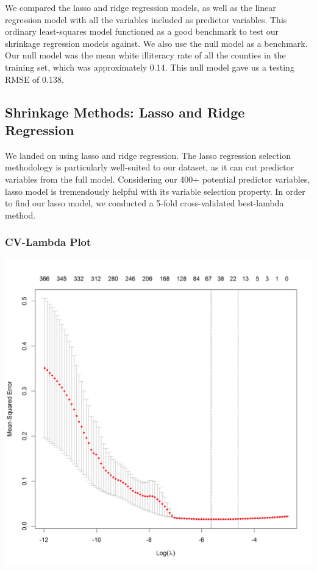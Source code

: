 \documentclass[a4paper,12pt]{article}
\begin{document}
We compared the lasso and ridge regression models, as well as the linear regression model with all the variables included as predictor variables. This ordinary least-squares model functioned as a good benchmark to test our shrinkage regression models against. We also use the null model as a benchmark. Our null model was the mean white illiteracy rate of all the counties in the training set, which was approximately 0.14. This null model gave us a testing RMSE of 0.138. 

\subsection{Shrinkage Methods: Lasso and Ridge Regression}
We landed on using lasso and ridge regression. The lasso regression selection methodology is particularly well-suited to our dataset, as it can cut predictor variables from the full model. Considering our 400+ potential predictor variables, lasso model is tremendously helpful with its variable selection property.
In order to find our lasso model, we conducted a 5-fold cross-validated best-lambda method.
\subsubsection{CV-Lambda Plot}
\includegraphics[scale=0.6]{cvplot.png}
\end{document}

